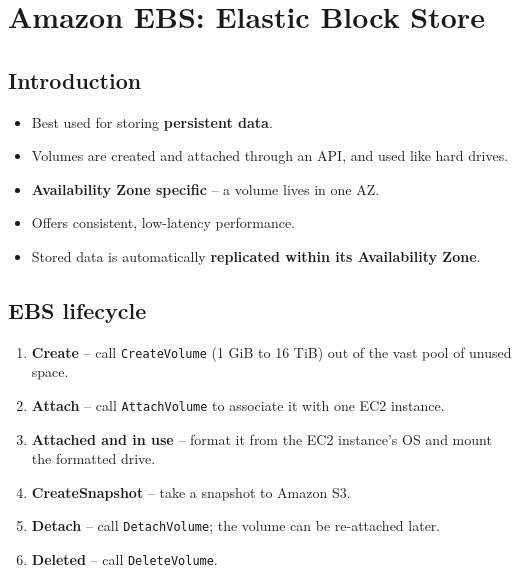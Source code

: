 \documentclass[11pt,a4paper]{article}
\begin{document}
\section{Amazon EBS: Elastic Block Store}


\subsection{Introduction}

\begin{itemize}\itemsep2pt
  \item Best used for storing \textbf{persistent data}.
  \item Volumes are created and attached through an API, and used like hard drives.
  \item \textbf{Availability Zone specific} -- a volume lives in one AZ.
  \item Offers consistent, low-latency performance.
  \item Stored data is automatically \textbf{replicated within its Availability Zone}.
\end{itemize}

\subsection{EBS lifecycle}


\begin{enumerate}\itemsep2pt
  \item \textbf{Create} -- call \texttt{CreateVolume} (1 GiB to 16 TiB) out of the vast pool
        of unused space.
  \item \textbf{Attach} -- call \texttt{AttachVolume} to associate it with one EC2 instance.
  \item \textbf{Attached and in use} -- format it from the EC2 instance's OS and mount the
        formatted drive.
  \item \textbf{CreateSnapshot} -- take a snapshot to Amazon S3.
  \item \textbf{Detach} -- call \texttt{DetachVolume}; the volume can be re-attached later.
  \item \textbf{Deleted} -- call \texttt{DeleteVolume}.
\end{enumerate}
\end{document}
